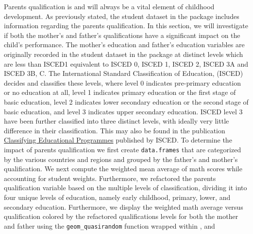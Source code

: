 Parents qualification is and will always be a vital element of childhood
development. As previously stated, the student dataset in the package
includes information regarding the parents qualification. In this
section, we will investigate if both the mother's and father's
qualifications have a significant impact on the child's performance. The
mother's education and father's education variables are originally
recorded in the student dataset in the  package
at distinct levels which are less than ISCED1 equivalent to ISCED 0,
ISCED 1, ISCED 2, ISCED 3A and ISCED 3B, C. The International Standard
Classification of Education, (ISCED) decides and classifies these
levels, where level 0 indicates pre-primary education or no education at
all, level 1 indicates primary education or the first stage of basic
education, level 2 indicates lower secondary education or the second
stage of basic education, and level 3 indicates upper secondary
education. ISCED level 3 have been further classified into three
distinct levels, with ideally very little difference in their
classification. This may also be found in the publication
\href{https://www.oecd.org/education/1841854.pdf}{Classifying
Educational Programmes} \citep{isced} published by ISCED. To determine
the impact of parents qualification we first create \texttt{data.frames}
that are categorized by the various countries and regions and grouped by
the father's and mother's qualification. We next compute the weighted
mean average of math scores while accounting for student weights.
Furthermore, we refactored the parents qualification variable based on
the multiple levels of classification, dividing it into four unique
levels of education, namely early childhood, primary, lower, and
secondary education. Furthermore, we display the weighted math average
versus qualification colored by the refactored qualifications levels for
both the mother and father using the \texttt{geom\_quasirandom} function
wrapped within  \citep{ggplot2}, 
\citep{viridis} and  \citep{patchwork}

